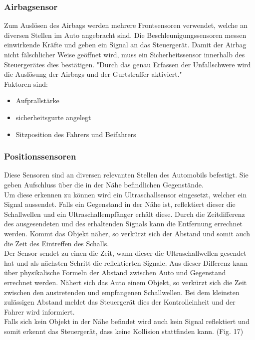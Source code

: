 	\subsubsection{Airbagsensor}
	Zum Auslösen des Airbags werden mehrere Frontsensoren verwendet, welche an diversen Stellen im Auto angebracht sind. Die Beschleunigungssensoren messen einwirkende Kräfte und geben ein Signal an das Steuergerät. Damit der Airbag nicht fälschlicher Weise geöffnet wird, muss ein Sicherheitssensor innerhalb des Steuergerätes dies bestätigen. "Durch das genau Erfassen der Unfallschwere wird die Auslösung der Airbags und der Gurtstraffer aktiviert."\cite{TS_airbag}\\
	Faktoren sind: 
	
	\begin{itemize}
		\item Aufprallstärke
		\item sicherheitsgurte angelegt
		\item Sitzposition des Fahrers und Beifahrers
	\end{itemize}
	
	
	\subsubsection{Positionssensoren}
	Diese Sensoren sind an diversen relevanten Stellen des Automobils befestigt. Sie geben Aufschluss über die in der Nähe befindlichen Gegenstände.\\
	Um diese erkennen zu können wird ein Ultraschallsensor eingesetzt, welcher ein Signal aussendet. Falls ein Gegenstand in der Nähe ist, reflektiert dieser die Schallwellen und ein Ultraschallempfänger erhält diese. Durch die Zeitdifferenz des ausgesendeten und des erhaltenden Signals kann die Entfernung errechnet werden. Kommt das Objekt näher, so verkürzt sich der Abstand und somit auch die Zeit des Eintreffen des Schalls.\\
	Der Sensor sendet zu einen die Zeit, wann dieser die Ultraschallwellen gesendet hat und als nächsten Schritt die reflektierten Signale. Aus dieser Differenz kann über physikalische Formeln der Abstand zwischen Auto und Gegenstand errechnet werden. Nähert sich das Auto einem Objekt, so verkürzt sich die Zeit zwischen den austretenden und empfangenen Schallwellen. Bei dem kleinsten zulässigen Abstand meldet das Steuergerät dies der Kontrolleinheit und der Fahrer wird informiert.\\
	Falls sich kein Objekt in der Nähe befindet wird auch kein Signal reflektiert und somit erkennt das Steuergerät, dass keine Kollision stattfinden kann. (Fig. 17)
	
